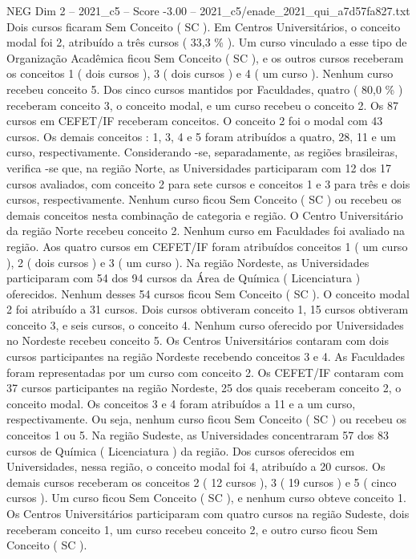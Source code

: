 \begin{textsample}{NEG Dim 2 – 2021\_c5 – Score -3.00 – 2021\_c5/enade\_2021\_qui\_a7d57fa827.txt}
Dois cursos ficaram Sem Conceito ( SC ).
Em Centros Universitários, o conceito modal foi 2, atribuído a três cursos ( 33,3 \% ).
Um curso vinculado a esse tipo de Organização Acadêmica ficou Sem Conceito ( SC ), e os outros cursos receberam os conceitos 1 ( dois cursos ), 3 ( dois cursos ) e 4 ( um curso ).
Nenhum curso recebeu conceito 5.
Dos cinco cursos mantidos por Faculdades, quatro ( 80,0 \% ) receberam conceito 3, o conceito modal, e um curso recebeu o conceito 2.
Os 87 cursos em CEFET/IF receberam conceitos.
O conceito 2 foi o modal com 43 cursos.
Os demais conceitos : 1, 3, 4 e 5 foram atribuídos a quatro, 28, 11 e um curso, respectivamente.
Considerando -se, separadamente, as regiões brasileiras, verifica -se que, na região Norte, as Universidades participaram com 12 dos 17 cursos avaliados, com conceito 2 para sete cursos e conceitos 1 e 3 para três e dois cursos, respectivamente.
Nenhum curso ficou Sem Conceito ( SC ) ou recebeu os demais conceitos nesta combinação de categoria e região.
O Centro Universitário da região Norte recebeu conceito 2.
Nenhum curso em Faculdades foi avaliado na região.
Aos quatro cursos em CEFET/IF foram atribuídos conceitos 1 ( um curso ), 2 ( dois cursos ) e 3 ( um curso ).
Na região Nordeste, as Universidades participaram com 54 dos 94 cursos da Área de Química ( Licenciatura ) oferecidos.
Nenhum desses 54 cursos ficou Sem Conceito ( SC ).
O conceito modal 2 foi atribuído a 31 cursos.
Dois cursos obtiveram conceito 1, 15 cursos obtiveram conceito 3, e seis cursos, o conceito 4.
Nenhum curso oferecido por Universidades no Nordeste recebeu conceito 5.
Os Centros Universitários contaram com dois cursos participantes na região Nordeste recebendo conceitos 3 e 4.
As Faculdades foram representadas por um curso com conceito 2.
Os CEFET/IF contaram com 37 cursos participantes na região Nordeste, 25 dos quais receberam conceito 2, o conceito modal.
Os conceitos 3 e 4 foram atribuídos a 11 e a um curso, respectivamente.
Ou seja, nenhum curso ficou Sem Conceito ( SC ) ou recebeu os conceitos 1 ou 5.
Na região Sudeste, as Universidades concentraram 57 dos 83 cursos de Química ( Licenciatura ) da região.
Dos cursos oferecidos em Universidades, nessa região, o conceito modal foi 4, atribuído a 20 cursos.
Os demais cursos receberam os conceitos 2 ( 12 cursos ), 3 ( 19 cursos ) e 5 ( cinco cursos ).
Um curso ficou Sem Conceito ( SC ), e nenhum curso obteve conceito 1.
Os Centros Universitários participaram com quatro cursos na região Sudeste, dois receberam conceito 1, um curso recebeu conceito 2, e outro curso ficou Sem Conceito ( SC ).

\end{textsample}
